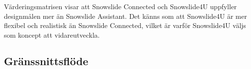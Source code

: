 \documentclass[a4paper,12pt,titlepage]{article}
\begin{document}
Värderingsmatrisen visar att Snowslide Connected och Snowslide4U
uppfyller designmålen mer än Snowslide Assistant. Det känns som att Snowslide4U
är mer flexibel och realistisk än Snowslide Connected, vilket är
varför Snowslide4U väljs som koncept att vidareutveckla.

\subsection*{Gränssnittsflöde}
\end{document}
